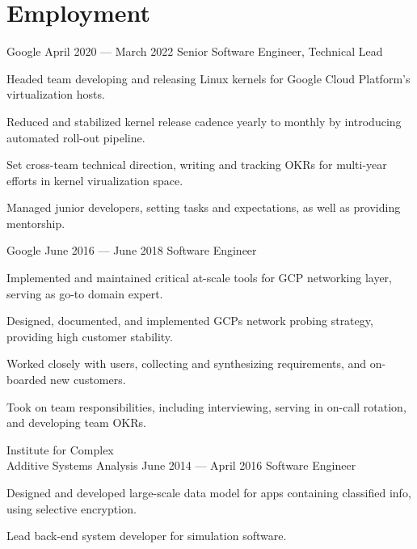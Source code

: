 \documentclass{tc_cv}
\begin{document}
\hfill\vline\hfill
\begin{minipage}[t]{0.6\linewidth}
  \section{Employment}
  \begin{job}{Google}
    {April 2020 --- March 2022}
    {Senior Software Engineer, Technical Lead}
    \item Headed team developing and releasing Linux kernels for Google Cloud
      Platform's virtualization hosts.
    \item Reduced and stabilized kernel release cadence yearly to monthly by
      introducing automated roll-out pipeline.
    \item Set cross-team technical direction, writing and tracking OKRs for
      multi-year efforts in kernel virualization space.
    \item Managed junior developers, setting tasks and expectations, as well as
      providing mentorship.
  \end{job}
  \vspace{1em}
  \begin{job}{Google}
    {June 2016 --- June 2018}
    {Software Engineer}
    \item Implemented and maintained critical at-scale tools for GCP
      networking layer, serving as go-to domain expert.
    \item Designed, documented, and implemented GCPs network probing strategy,
      providing high customer stability.
    \item Worked closely with users, collecting and synthesizing requirements,
      and on-boarded new customers.
    \item Took on team responsibilities, including interviewing, serving in
      on-call rotation, and developing team OKRs.
  \end{job}
  \vspace{1em}
  \begin{job}{Institute for Complex \\ Additive Systems Analysis}
    {June 2014 --- April 2016}
    {Software Engineer}
    \item Designed and developed large-scale data model for apps containing
      classified info, using selective encryption.
    \item Lead back-end system developer for simulation software.

\end{job}
\end{minipage}
\end{document}
